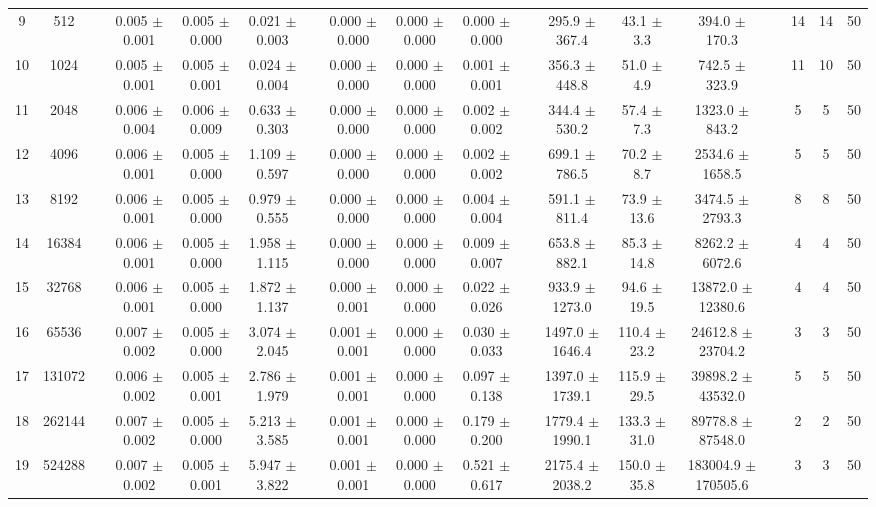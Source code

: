 \documentclass[11pt]{article}
\begin{document}
\begin{landscape}
\begin{table}
\begin{tabular}{cccccccccccccccccc}
 9 &     512 &&  0.005 $\pm$ 0.001 & 0.005 $\pm$ 0.000 & 0.021 $\pm$ 0.003 &&  0.000 $\pm$ 0.000 & 0.000 $\pm$ 0.000 & 0.000 $\pm$ 0.000 &&  295.9 $\pm$ 367.4 & 43.1 $\pm$  3.3 & 394.0 $\pm$ 170.3 && 14& 14& 50\\
10 &    1024 &&  0.005 $\pm$ 0.001 & 0.005 $\pm$ 0.001 & 0.024 $\pm$ 0.004 &&  0.000 $\pm$ 0.000 & 0.000 $\pm$ 0.000 & 0.001 $\pm$ 0.001 &&  356.3 $\pm$ 448.8 & 51.0 $\pm$  4.9 & 742.5 $\pm$ 323.9 && 11& 10& 50\\
11 &    2048 &&  0.006 $\pm$ 0.004 & 0.006 $\pm$ 0.009 & 0.633 $\pm$ 0.303 &&  0.000 $\pm$ 0.000 & 0.000 $\pm$ 0.000 & 0.002 $\pm$ 0.002 &&  344.4 $\pm$ 530.2 & 57.4 $\pm$  7.3 & 1323.0 $\pm$ 843.2 && 5& 5& 50\\
12 &    4096 &&  0.006 $\pm$ 0.001 & 0.005 $\pm$ 0.000 & 1.109 $\pm$ 0.597 &&  0.000 $\pm$ 0.000 & 0.000 $\pm$ 0.000 & 0.002 $\pm$ 0.002 &&  699.1 $\pm$ 786.5 & 70.2 $\pm$  8.7 & 2534.6 $\pm$ 1658.5 && 5& 5& 50\\
13 &    8192 &&  0.006 $\pm$ 0.001 & 0.005 $\pm$ 0.000 & 0.979 $\pm$ 0.555 &&  0.000 $\pm$ 0.000 & 0.000 $\pm$ 0.000 & 0.004 $\pm$ 0.004 &&  591.1 $\pm$ 811.4 & 73.9 $\pm$ 13.6 & 3474.5 $\pm$ 2793.3 && 8& 8& 50\\
14 &   16384 &&  0.006 $\pm$ 0.001 & 0.005 $\pm$ 0.000 & 1.958 $\pm$ 1.115 &&  0.000 $\pm$ 0.000 & 0.000 $\pm$ 0.000 & 0.009 $\pm$ 0.007 &&  653.8 $\pm$ 882.1 & 85.3 $\pm$ 14.8 & 8262.2 $\pm$ 6072.6 && 4& 4& 50\\
15 &   32768 &&  0.006 $\pm$ 0.001 & 0.005 $\pm$ 0.000 & 1.872 $\pm$ 1.137 &&  0.000 $\pm$ 0.001 & 0.000 $\pm$ 0.000 & 0.022 $\pm$ 0.026 &&  933.9 $\pm$ 1273.0 & 94.6 $\pm$ 19.5 & 13872.0 $\pm$ 12380.6 && 4& 4& 50\\
16 &   65536 &&  0.007 $\pm$ 0.002 & 0.005 $\pm$ 0.000 & 3.074 $\pm$ 2.045 &&  0.001 $\pm$ 0.001 & 0.000 $\pm$ 0.000 & 0.030 $\pm$ 0.033 &&  1497.0 $\pm$ 1646.4 & 110.4 $\pm$ 23.2 & 24612.8 $\pm$ 23704.2 && 3& 3& 50\\
17 &  131072 &&  0.006 $\pm$ 0.002 & 0.005 $\pm$ 0.001 & 2.786 $\pm$ 1.979 &&  0.001 $\pm$ 0.001 & 0.000 $\pm$ 0.000 & 0.097 $\pm$ 0.138 &&  1397.0 $\pm$ 1739.1 & 115.9 $\pm$ 29.5 & 39898.2 $\pm$ 43532.0 && 5& 5& 50\\
18 &  262144 &&  0.007 $\pm$ 0.002 & 0.005 $\pm$ 0.000 & 5.213 $\pm$ 3.585 &&  0.001 $\pm$ 0.001 & 0.000 $\pm$ 0.000 & 0.179 $\pm$ 0.200 &&  1779.4 $\pm$ 1990.1 & 133.3 $\pm$ 31.0 & 89778.8 $\pm$ 87548.0 && 2& 2& 50\\
19 &  524288 &&  0.007 $\pm$ 0.002 & 0.005 $\pm$ 0.001 & 5.947 $\pm$ 3.822 &&  0.001 $\pm$ 0.001 & 0.000 $\pm$ 0.000 & 0.521 $\pm$ 0.617 &&  2175.4 $\pm$ 2038.2 & 150.0 $\pm$ 35.8 & 183004.9 $\pm$ 170505.6 && 3& 3& 50\\

\end{tabular}
\end{table}
\end{landscape}
\end{document}
